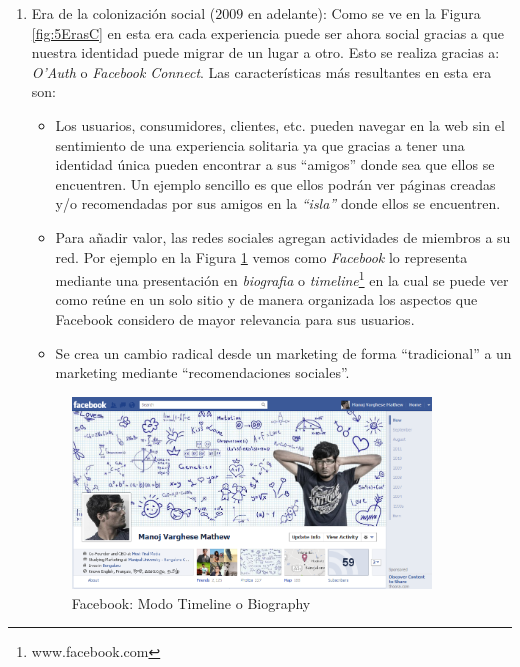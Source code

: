 \documentclass[oneside,12pt,a4paper]{memoir}%
\begin{document}
\begin{enumerate}
		  \item Era de la colonizaci\'on social ($2009$ en adelante): Como se ve en la Figura
		  \ref{fig:5ErasC} en esta era cada experiencia puede ser ahora social gracias
		  a que nuestra identidad puede migrar de un lugar a otro. Esto se realiza
		  gracias a: \textit{O'Auth} o \textit{Facebook Connect}. Las
		  caracter\'isticas m\'as resultantes en esta era son:
		  \begin{itemize}
		    \item Los usuarios, consumidores, clientes, etc. pueden navegar en la web
		    sin el sentimiento de una experiencia solitaria ya que gracias a tener
		    una identidad \'unica pueden encontrar a sus ``amigos'' donde sea que
		    ellos se encuentren. Un ejemplo sencillo es que ellos podr\'an ver
		    p\'aginas creadas y/o recomendadas por sus amigos en la \textit{``isla''}
		    donde ellos se encuentren.
		    \item Para a\~nadir valor, las redes sociales agregan actividades de
		    miembros a su red. Por ejemplo en la Figura \ref{fig:Biography}
		    vemos como \textit{Facebook} lo representa mediante una presentaci\'on en
		    \textit{biografia} o \textit{timeline}\footnote{www.facebook.com} en la
		    cual se puede ver como re\'une en un solo sitio y de manera organizada los
		    aspectos que Facebook considero de mayor relevancia para sus usuarios.
		    \item Se crea un cambio radical desde un marketing de forma
		    ``tradicional'' a un marketing mediante ``recomendaciones sociales''.
		  \end{itemize}

		  \begin{figure}[here]
			\centering
			\caption{Facebook: Modo Timeline o Biography}
			\includegraphics[width=0.9\textwidth]{figure/fig_biography.png}
			
			\label{fig:Biography}
		  \end{figure}
		  

\end{enumerate}
\end{document}
